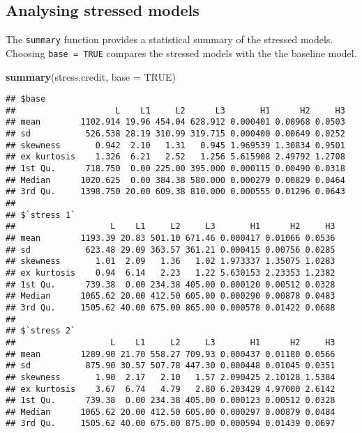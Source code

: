 \documentclass[
]{article}
\newenvironment{Shaded}{\begin{snugshade}}{\end{snugshade}}
\newcommand{\DataTypeTok}[1]{\textcolor[rgb]{0.13,0.29,0.53}{#1}}
\newcommand{\KeywordTok}[1]{\textcolor[rgb]{0.13,0.29,0.53}{\textbf{#1}}}
\newcommand{\NormalTok}[1]{#1}
\newcommand{\OtherTok}[1]{\textcolor[rgb]{0.56,0.35,0.01}{#1}}
\begin{document}
\hypertarget{analysing-stressed-models}{%
\subsection{Analysing stressed models}\label{analysing-stressed-models}}

The \texttt{summary} function provides a statistical summary of the stressed models. Choosing \texttt{base\ =\ TRUE} compares the stressed models with the the baseline model.

\begin{Shaded}
\begin{Highlighting}[]
\KeywordTok{summary}\NormalTok{(stress.credit, }\DataTypeTok{base =} \OtherTok{TRUE}\NormalTok{)}
\end{Highlighting}
\end{Shaded}

\begin{verbatim}
## $base
##                    L    L1     L2      L3       H1      H2     H3
## mean        1102.914 19.96 454.04 628.912 0.000401 0.00968 0.0503
## sd           526.538 28.19 310.99 319.715 0.000400 0.00649 0.0252
## skewness       0.942  2.10   1.31   0.945 1.969539 1.30834 0.9501
## ex kurtosis    1.326  6.21   2.52   1.256 5.615908 2.49792 1.2708
## 1st Qu.      718.750  0.00 225.00 395.000 0.000115 0.00490 0.0318
## Median      1020.625  0.00 384.38 580.000 0.000279 0.00829 0.0464
## 3rd Qu.     1398.750 20.00 609.38 810.000 0.000555 0.01296 0.0643
## 
## $`stress 1`
##                   L    L1     L2     L3       H1      H2     H3
## mean        1193.39 20.83 501.10 671.46 0.000417 0.01066 0.0536
## sd           623.48 29.09 363.57 361.21 0.000415 0.00756 0.0285
## skewness       1.01  2.09   1.36   1.02 1.973337 1.35075 1.0283
## ex kurtosis    0.94  6.14   2.23   1.22 5.630153 2.23353 1.2382
## 1st Qu.      739.38  0.00 234.38 405.00 0.000120 0.00512 0.0328
## Median      1065.62 20.00 412.50 605.00 0.000290 0.00878 0.0483
## 3rd Qu.     1505.62 40.00 675.00 865.00 0.000578 0.01422 0.0688
## 
## $`stress 2`
##                   L    L1     L2     L3       H1      H2     H3
## mean        1289.90 21.70 558.27 709.93 0.000437 0.01180 0.0566
## sd           875.90 30.57 507.78 447.30 0.000448 0.01045 0.0351
## skewness       1.90  2.17   2.10   1.57 2.090425 2.10128 1.5384
## ex kurtosis    3.67  6.74   4.79   2.80 6.203429 4.97000 2.6142
## 1st Qu.      739.38  0.00 234.38 405.00 0.000123 0.00512 0.0328
## Median      1065.62 20.00 412.50 605.00 0.000297 0.00879 0.0484
## 3rd Qu.     1505.62 40.00 675.00 875.00 0.000594 0.01439 0.0697
\end{verbatim}
\end{document}
